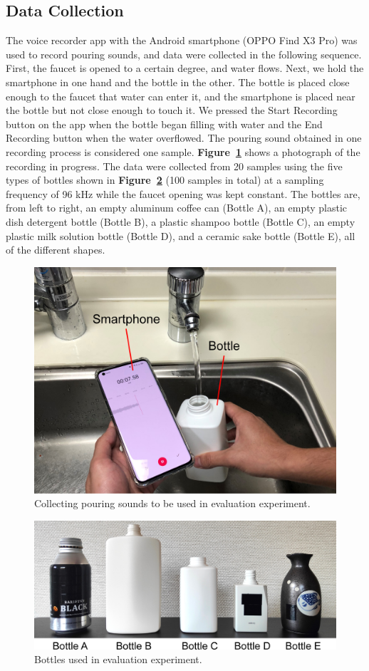 \documentclass[sigconf]{acmart}
\newcommand\figref[1]{\textbf{Figure~\ref{fig:#1}}}
\begin{document}
\subsection{Data Collection}
The voice recorder app with the Android smartphone (OPPO Find X3 Pro) was used to record pouring sounds, and data were collected in the following sequence. First, the faucet is opened to a certain degree, and water flows. Next, we hold the smartphone in one hand and the bottle in the other. The bottle is placed close enough to the faucet that water can enter it, and the smartphone is placed near the bottle but not close enough to touch it. We pressed the Start Recording button on the app when the bottle began filling with water and the End Recording button when the water overflowed. The pouring sound obtained in one recording process is considered one sample. \figref{data_acquisition} shows a photograph of the recording in progress. The data were collected from 20 samples using the five types of bottles shown in \figref{bottles} (100 samples in total) at a sampling frequency of 96 kHz while the faucet opening was kept constant. The bottles are, from left to right, an empty aluminum coffee can (Bottle A), an empty plastic dish detergent bottle (Bottle B), a plastic shampoo bottle (Bottle C), an empty plastic milk solution bottle (Bottle D), and a ceramic sake bottle (Bottle E), all of the different shapes.

\begin{figure}[!t]
  \centering
  \includegraphics[width=0.5\linewidth]{figures/data_acquisition.eps}
  \caption{Collecting pouring sounds to be used in evaluation experiment.}
  \label{fig:data_acquisition}
\end{figure}

\begin{figure}[!t]
  \centering
  \includegraphics[width=0.5\linewidth]{figures/bottles.eps}
  \caption{Bottles used in evaluation experiment.}
  \label{fig:bottles}
\end{figure}
\end{document}
